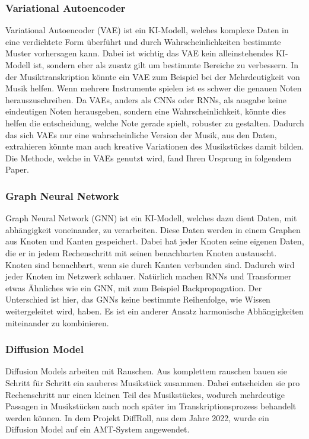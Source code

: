 \subsubsection*{Variational Autoencoder}
Variational Autoencoder (VAE) ist ein KI-Modell, welches komplexe Daten in eine verdichtete Form überführt
und durch Wahrscheinlichkeiten bestimmte Muster vorhersagen kann.
\cite{kingma2019introduction}
Dabei ist wichtig das VAE kein alleinstehendes KI-Modell ist,
sondern eher als zusatz gilt um bestimmte Bereiche zu verbessern.
In der Musiktranskription könnte ein VAE zum Beispiel bei der Mehrdeutigkeit von Musik helfen.
Wenn mehrere Instrumente spielen ist es schwer die genauen Noten herauszuschreiben.
Da VAEs, anders als CNNs oder RNNs, als ausgabe keine eindeutigen Noten herausgeben,
sondern eine Wahrscheinlichkeit, könnte dies helfen die entscheidung, welche Note gerade spielt, robuster zu gestalten.
Dadurch das sich VAEs nur eine wahrscheinliche Version der Musik, aus den Daten,
extrahieren könnte man auch kreative Variationen des Musikstückes damit bilden.
Die Methode, welche in VAEs genutzt wird, fand Ihren Ursprung in folgendem Paper.
\cite{kingma2013auto}

\subsubsection*{Graph Neural Network}
Graph Neural Network (GNN) ist ein KI-Modell, welches dazu dient Daten, mit abhängigkeit voneinander, zu verarbeiten.
Diese Daten werden in einem Graphen aus Knoten und Kanten gespeichert.
Dabei hat jeder Knoten seine eigenen Daten, die er in jedem Rechenschritt mit seinen benachbarten Knoten austauscht.
Knoten sind benachbart, wenn sie durch Kanten verbunden sind.
Dadurch wird jeder Knoten im Netzwerk schlauer.
Natürlich machen RNNs und Transformer etwas Ähnliches wie ein GNN, mit zum Beispiel Backpropagation.
Der Unterschied ist hier, das GNNs keine bestimmte Reihenfolge, wie Wissen weitergeleitet wird, haben.
Es ist ein anderer Ansatz harmonische Abhängigkeiten miteinander zu kombinieren.
\cite{wu2020comprehensive}

\subsubsection*{Diffusion Model}
Diffusion Models arbeiten mit Rauschen.
Aus komplettem rauschen bauen sie Schritt für Schritt ein sauberes Musikstück zusammen.
Dabei entscheiden sie pro Rechenschritt nur einen kleinen Teil des Musikstückes,
wodurch mehrdeutige Passagen in Musikstücken auch noch später im Transkriptionsprozess behandelt werden können.
In dem Projekt DiffRoll, aus dem Jahre 2022, wurde ein Diffusion Model auf ein AMT-System angewendet.
\cite{cheuk2022diffroll}

